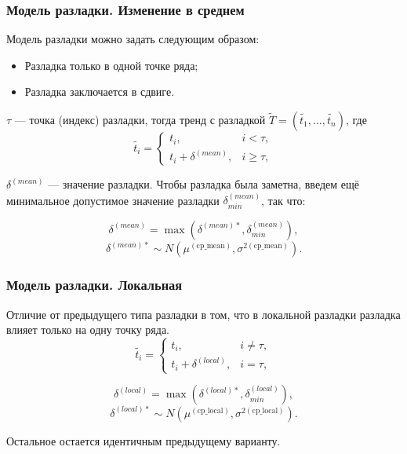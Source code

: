 \documentclass[intlimits, 9pt, unicode]{beamer}
\begin{document}
\begin{frame}
    \frametitle{Модель разладки. Изменение в среднем}

Модель разладки можно задать следующим образом:
\begin{itemize}
	\item Разладка только в одной точке ряда;
	\item Разладка заключается в сдвиге.
\end{itemize}
$\tau$ --- точка (индекс) разладки, тогда тренд с разладкой $ \tilde{T} = (\tilde{t_1}, \dots, \tilde{t_n}) $, где
\begin{equation*}
\tilde{t_i} =
	\begin{cases}
		t_i, & i < \tau, \\
		t_i + \delta^{(mean)}, & i \geqslant \tau,
	\end{cases}
\end{equation*}

$ \delta^{(mean)} $  --- значение разладки. Чтобы разладка была заметна, введем ещё минимальное допустимое значение разладки $\delta_{min}^{(mean)}$, так что:

\begin{equation*}
\delta^{(mean)} = \max(\delta^{(mean)*}, \delta_{min}^{(mean)} ),
\end{equation*}
\begin{equation*}
\delta^{(mean)*} \sim N(\mu^{\mathrm{(cp\_mean)}}, \sigma^{2\mathrm{(cp\_mean)}}).
\end{equation*}




\end{frame}

\begin{frame}
    \frametitle{Модель разладки. Локальная}

Отличие от предыдущего типа разладки в том, что в локальной разладки разладка влияет только на одну точку ряда.
\begin{equation*}
\tilde{t_i} =
	\begin{cases}
		t_i, & i \neq \tau, \\
		t_i + \delta^{(local)}, & i = \tau,
	\end{cases}
\end{equation*}

\begin{equation*}
\delta^{(local)} = \max(\delta^{(local)*}, \delta_{min}^{(local)} ),
\end{equation*}
\begin{equation*}
\delta^{(local)*} \sim N(\mu^{\mathrm{(cp\_local)}}, \sigma^{2\mathrm{(cp\_local)}}).
\end{equation*}

Остальное остается идентичным предыдущему варианту.

\end{frame}
\end{document}
